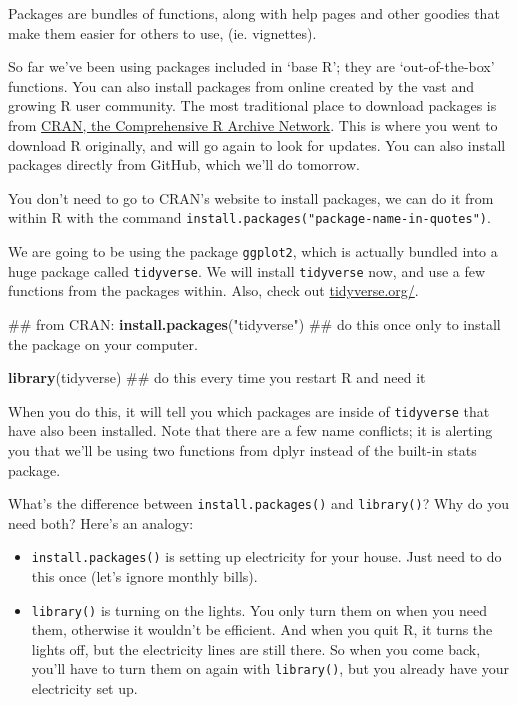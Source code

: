 \documentclass[]{book}
\newenvironment{Shaded}{\begin{snugshade}}{\end{snugshade}}
\newcommand{\KeywordTok}[1]{\textcolor[rgb]{0.13,0.29,0.53}{\textbf{#1}}}
\newcommand{\StringTok}[1]{\textcolor[rgb]{0.31,0.60,0.02}{#1}}
\newcommand{\NormalTok}[1]{#1}
\providecommand{\tightlist}{%
  \setlength{\itemsep}{0pt}\setlength{\parskip}{0pt}}
\theoremstyle{definition}
\theoremstyle{definition}
\theoremstyle{definition}
\theoremstyle{remark}
\begin{document}
Packages are bundles of functions, along with help pages and other
goodies that make them easier for others to use, (ie. vignettes).

So far we've been using packages included in `base R'; they are
`out-of-the-box' functions. You can also install packages from online
created by the vast and growing R user community. The most traditional
place to download packages is from
\href{https://cran.r-project.org/}{CRAN, the Comprehensive R Archive
Network}. This is where you went to download R originally, and will go
again to look for updates. You can also install packages directly from
GitHub, which we'll do tomorrow.

You don't need to go to CRAN's website to install packages, we can do it
from within R with the command
\texttt{install.packages("package-name-in-quotes")}.

We are going to be using the package \texttt{ggplot2}, which is actually
bundled into a huge package called \texttt{tidyverse}. We will install
\texttt{tidyverse} now, and use a few functions from the packages
within. Also, check out
\href{https://www.tidyverse.org}{tidyverse.org/}.

\begin{Shaded}
\begin{Highlighting}[]
\NormalTok{## from CRAN:}
\KeywordTok{install.packages}\NormalTok{(}\StringTok{"tidyverse"}\NormalTok{) ## do this once only to install the package on your computer.}
\end{Highlighting}
\end{Shaded}

\begin{Shaded}
\begin{Highlighting}[]
\KeywordTok{library}\NormalTok{(tidyverse) ## do this every time you restart R and need it }
\end{Highlighting}
\end{Shaded}

When you do this, it will tell you which packages are inside of
\texttt{tidyverse} that have also been installed. Note that there are a
few name conflicts; it is alerting you that we'll be using two functions
from dplyr instead of the built-in stats package.

What's the difference between \texttt{install.packages()} and
\texttt{library()}? Why do you need both? Here's an analogy:

\begin{itemize}
\tightlist
\item
  \texttt{install.packages()} is setting up electricity for your house.
  Just need to do this once (let's ignore monthly bills).
\item
  \texttt{library()} is turning on the lights. You only turn them on
  when you need them, otherwise it wouldn't be efficient. And when you
  quit R, it turns the lights off, but the electricity lines are still
  there. So when you come back, you'll have to turn them on again with
  \texttt{library()}, but you already have your electricity set up.
\end{itemize}
\end{document}
